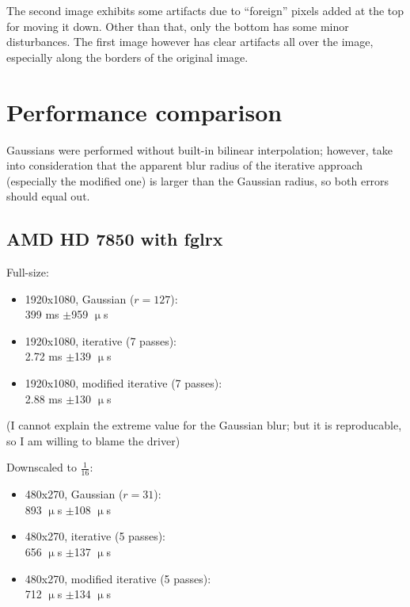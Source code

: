 \documentclass[english,fleqn,10pt,twocolumn]{article}
\begin{document}
The second image exhibits some artifacts due to “foreign” pixels added at the top for moving it down. Other than that, only the bottom has some minor disturbances. The first image however has
clear artifacts all over the image, especially along the borders of the original image.


\newpage

\section{Performance comparison}

Gaussians were performed without built-in bilinear interpolation; however, take into consideration that the apparent blur radius of the iterative approach (especially the modified one) is larger
than the Gaussian radius, so both errors should equal out.

\subsection{AMD HD 7850 with fglrx}

Full-size:
\begin{itemize}
    \item 1920x1080, Gaussian ($r = 127$): \\
        399 ms $\pm$959 $\upmu$s
    \item 1920x1080, iterative (7 passes): \\
        2.72 ms $\pm$139 $\upmu$s
    \item 1920x1080, modified iterative (7 passes): \\
        2.88 ms $\pm$130 $\upmu$s
\end{itemize}

(I cannot explain the extreme value for the Gaussian blur; but it is reproducable, so I am willing to blame the driver)

Downscaled to $\frac 1{16}$:
\begin{itemize}
    \item 480x270, Gaussian ($r = 31$): \\
        893 $\upmu$s $\pm$108 $\upmu$s
    \item 480x270, iterative (5 passes): \\
        656 $\upmu$s $\pm$137 $\upmu$s
    \item 480x270, modified iterative (5 passes): \\
        712 $\upmu$s $\pm$134 $\upmu$s
\end{itemize}
\end{document}
